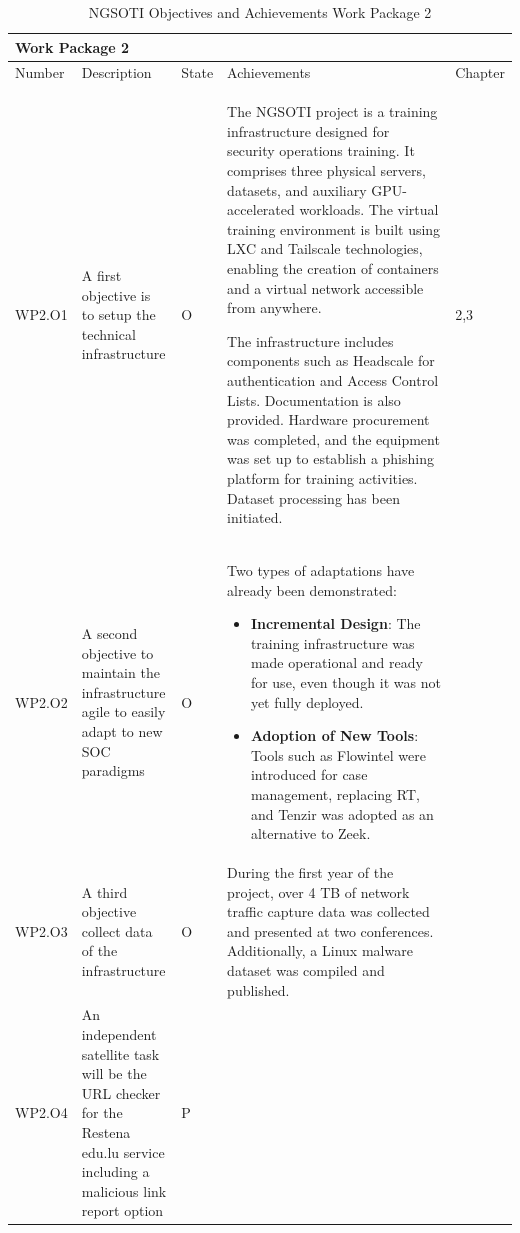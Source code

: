 \begin{table}[h]
\centering

\begin{tabular}{ |p{0.07\linewidth}  |p{0.2\linewidth}|        p{0.04\linewidth}|    p{0.62\linewidth}|  p{0.07\linewidth}|}\hline
\multicolumn{5}{|p{0.97\linewidth}|}{Work Package 2} \\
\hline
                  Number             & Description & State & Achievements & Chapter \\
\hline
WP2.O1 &
A first objective is to setup the technical infrastructure & O &

The NGSOTI project is a training infrastructure designed for security
operations training. It comprises three physical servers, datasets, and
auxiliary GPU-accelerated workloads. The virtual training environment is
built using LXC and Tailscale technologies, enabling the creation of
containers and a virtual network accessible from anywhere.

The infrastructure includes components such as Headscale for authentication
and Access Control Lists. Documentation is also provided. Hardware
procurement was completed, and the equipment was set up to establish a
phishing platform for training activities. Dataset processing has been
initiated.

&
2,3 \\
\hline
WP2.O2 &
A second objective to maintain the infrastructure agile to easily adapt to new
SOC paradigms
&O &
Two types of adaptations have already been demonstrated:
\begin{itemize}
    \item \textbf{Incremental Design}: The training infrastructure was made
    operational and ready for use, even though it was not yet fully deployed.
    \item \textbf{Adoption of New Tools}: Tools such as Flowintel were introduced
    for case management, replacing RT, and Tenzir was adopted as an alternative
    to Zeek.
\end{itemize}

&
\\

\hline

WP2.O3 &
A third objective collect data of the infrastructure
& O &
During the first year of the project, over 4 TB of network traffic capture data was collected and presented at two conferences. Additionally, a Linux malware dataset was compiled and published.
&
\\

\hline

WP2.O4 &
An independent satellite task will be the URL checker for the Restena edu.lu
service including a malicious link report
option
& P &
&
\\
\hline
\end{tabular}
\caption{NGSOTI Objectives and Achievements Work Package 2}
\label{oa2}
\end{table}


